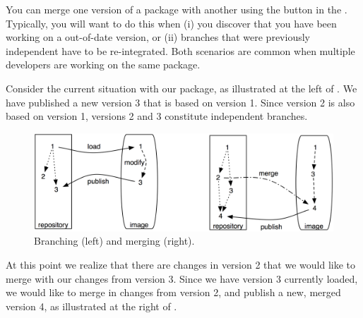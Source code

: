 \documentclass[a4paper,10pt,twoside]{book}
\begin{document}

You can merge one version of a package with another using the  button in the \MCB. Typically, you will want to do this when (i) you discover that you have been working on a out-of-date version, or (ii) branches that were previously independent have to be re-integrated. Both scenarios are common when multiple developers are working on the same package.


Consider the current situation with our  package, as illustrated at the left of . We have published a new version 3 that is based on version 1.
Since version 2 is also based on version 1, versions 2 and 3 constitute independent branches.

\begin{figure}[ht]\centering
	\includegraphics[width=\textwidth]{branching-merging}
	\caption{Branching (left) and merging (right).}
\end{figure}

At this point we realize that there are changes in version 2 that we would like to merge with our changes from version 3.  Since we have version 3 currently loaded, we would like to merge in changes from version 2, and publish a new, merged version 4, as illustrated at the right of .
\end{document}
